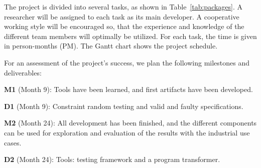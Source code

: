 \documentclass[fleqn,12pt]{article}
\begin{document}
%
%
%


The project is divided into several tasks, as shown in  Table~\ref{tab:packages}.
A researcher will be assigned to each task as its main developer.
A cooperative
working style will be encouraged so, that the experience and
knowledge of the different team members will optimally be utilized.
For each task, the time is given in person-months (PM). The Gantt chart shows
the project schedule.


For an assessment of the project's success, we plan the following milestones and deliverables:

\textbf{M1} (Month 9): Tools have been learned, and first artifacts have been developed.

\textbf{D1} (Month 9): Constraint random testing and valid and faulty specifications.


\textbf{M2} (Month 24): All development has been finished, and the different components
can be used for exploration and evaluation of the results with the industrial use cases.

\textbf{D2} (Month 24): Tools: testing framework and a program transformer.
\end{document}
